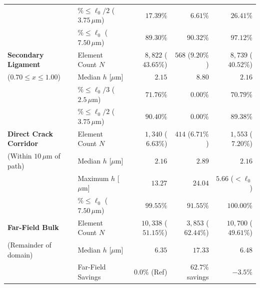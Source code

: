 \begin{table}[htbp]
\begin{tabularx}{\textwidth}{p{3.5cm}p{2.1cm}rrr}
                             & $\% \le \ell_0 / 2$ ($3.75\,\mu\mathrm{m}$) & $17.39\%$ & $6.61\%$ & $\mathbf{26.41\%}$ \\
                             & $\% \le \ell_0$ ($7.50\,\mu\mathrm{m}$) & $89.30\%$ & $90.32\%$ & $\mathbf{97.12\%}$ \\
\hline
\textbf{Secondary Ligament}  & Element Count $N$ & $8{,}822$ ($43.65\%$) & $568$ ($9.20\%$) & $8{,}739$ ($40.52\%$) \\
($0.70 \le x \le 1.00$)      & Median $h$ [$\mu\mathrm{m}$] & $2.15$ & $8.80$ & $\mathbf{2.16}$ \\
                             & $\% \le \ell_0 / 3$ ($2.5\,\mu\mathrm{m}$) & $71.76\%$ & $0.00\%$ & $\mathbf{70.79\%}$ \\
                             & $\% \le \ell_0 / 2$ ($3.75\,\mu\mathrm{m}$) & $90.40\%$ & $0.00\%$ & $\mathbf{89.38\%}$ \\
\hline
\textbf{Direct Crack Corridor} & Element Count $N$ & $1{,}340$ ($6.63\%$) & $414$ ($6.71\%$) & $1{,}553$ ($7.20\%$) \\
(Within $10\,\mu\mathrm{m}$ of path) & Median $h$ [$\mu\mathrm{m}$] & $2.16$ & $2.89$ & $\mathbf{2.16}$ \\
                             & Maximum $h$ [$\mu\mathrm{m}$] & $13.27$ & $24.04$ & $\mathbf{5.66}$ ($< \ell_0$) \\
                             & $\% \le \ell_0$ ($7.50\,\mu\mathrm{m}$) & $99.55\%$ & $91.55\%$ & $\mathbf{100.00\%}$ \\
\hline
\textbf{Far-Field Bulk}      & Element Count $N$ & $10{,}338$ ($51.15\%$) & $3{,}853$ ($62.44\%$) & $10{,}700$ ($49.61\%$) \\
(Remainder of domain)        & Median $h$ [$\mu\mathrm{m}$] & $6.35$ & $\mathbf{17.33}$ & $6.48$ \\
                             & Far-Field Savings & $0.0\%$ (Ref) & $\mathbf{62.7\%}$ savings & $-3.5\%$ \\
\hline
\end{tabularx}
\end{table}

